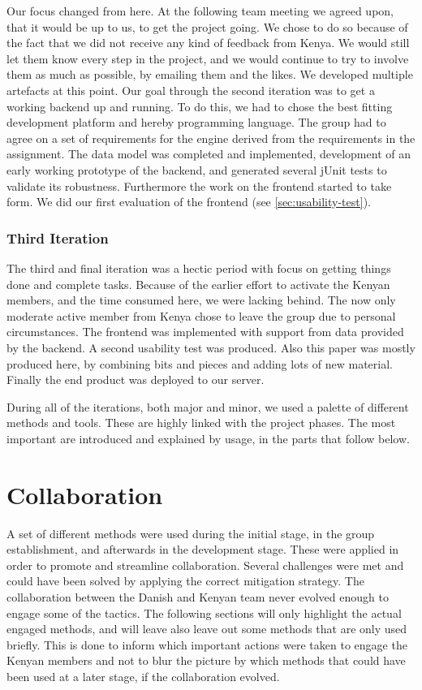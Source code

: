 Our focus changed from here. At the following team meeting we agreed upon, that it would be up to us, to get the project going. We chose to do so because of the fact that we did not receive any kind of feedback from Kenya. We would still let them know every step in the project, and we would continue to try to involve them as much as possible, by emailing them and the likes. We developed multiple artefacts at this point. Our goal through the second iteration was to get a working backend up and running. To do this, we had to chose the best fitting development platform and hereby programming language. The group had to agree on a set of requirements for the engine derived from the requirements in the assignment. The data model was completed and implemented, development of an early working prototype of the backend, and generated several jUnit tests to validate its robustness. Furthermore the work on the frontend started to take form. We did our first evaluation of the frontend (see \ref{sec:usability-test}).

\subsubsection{Third Iteration}
The third and final iteration was a hectic period with focus on getting things done and complete tasks. Because of the earlier effort to activate the Kenyan members, and the time consumed here, we were lacking behind. The now only moderate active member from Kenya chose to leave the group due to personal circumstances. The frontend was implemented with support from data provided by the backend. A second usability test was produced. Also this paper was mostly produced here, by combining bits and pieces and adding lots of new material. Finally the end product was deployed to our server.

During all of the iterations, both major and minor, we used a palette of different methods and tools. These are highly linked with the project phases. The most important are introduced and explained by usage, in the parts that follow below.

\section{Collaboration} \label{sec:collaboration}
A set of different methods were used during the initial stage, in the group establishment, and afterwards in the development stage. These were applied in order to promote and streamline collaboration. Several challenges were met and could have been solved by applying the correct mitigation strategy. The collaboration between the Danish and Kenyan team never evolved enough to engage some of the tactics. The following sections will only highlight the actual engaged methods, and will leave also leave out some methods that are only used briefly. This is done to inform which important actions were taken to engage the Kenyan members and not to blur the picture by which methods that could have been used at a later stage, if the collaboration evolved. 

